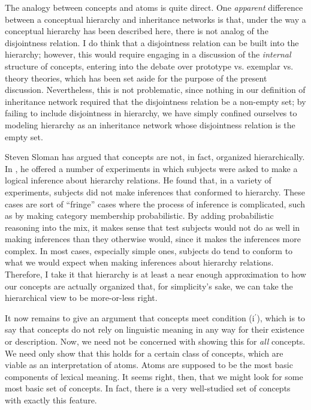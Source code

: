 \documentclass[12pt]{amsart}
\begin{document}
The analogy between concepts and atoms is quite direct. One \emph{apparent} difference between a conceptual hierarchy and inheritance networks is that, under the way a conceptual hierarchy has been described here, there is not analog of the disjointness relation. I do think that a disjointness relation can be built into the hierarchy; however, this would require engaging in a discussion of the \emph{internal} structure of concepts, entering into the debate over prototype vs. exemplar vs. theory theories, which has been set aside for the purpose of the present discussion. Nevertheless, this is not problematic, since nothing in our definition of inheritance network required that the disjointness relation be a non-empty set; by failing to include disjointness in hierarchy, we have simply confined ourselves to modeling hierarchy as an inheritance network whose disjointness relation is the empty set.

Steven Sloman has argued that concepts are not, in fact, organized hierarchically. In \cite{sloman_categorical_1998}, he offered a number of experiments in which subjects were asked to make a logical inference about hierarchy relations. He found that, in a variety of experiments, subjects did not make inferences that conformed to hierarchy. These cases are sort of ``fringe'' cases where the process of inference is complicated, such as by making category membership probabilistic. By adding probabilistic reasoning into the mix, it makes sense that test subjects would not do as well in making inferences than they otherwise would, since it makes the inferences more complex. In most cases, especially simple ones, subjects do tend to conform to what we would expect when making inferences about hierarchy relations. Therefore, I take it that hierarchy is at least a near enough approximation to how our concepts are actually organized that, for simplicity's sake, we can take the hierarchical view to be more-or-less right.

It now remains to give an argument that concepts meet condition (i$^\prime$), which is to say that concepts do not rely on linguistic meaning in any way for their existence or description. Now, we need not be concerned with showing this for \emph{all} concepts. We need only show that this holds for a certain class of concepts, which are viable as an interpretation of atoms. Atoms are supposed to be the most basic components of lexical meaning. It seems right, then, that we might look for some most basic set of concepts. In fact, there is a very well-studied set of concepts with exactly this feature.
\end{document}
